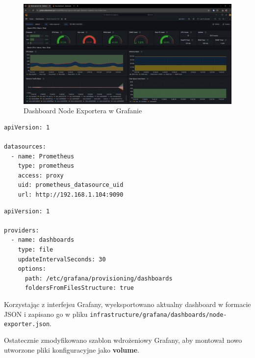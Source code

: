 \documentclass{article}
\begin{document}
\begin{figure}[H]
    \centering
    \includegraphics[width=1\linewidth]{grafanaNodeExporterDashboard.png}
    \caption{Dashboard Node Exportera w Grafanie}
    \label{fig:enter-label}
\end{figure}

\begin{lstlisting}[caption=Plik \texttt{infrastructure/grafana/datasources/datasources.yml}]
apiVersion: 1

datasources:
  - name: Prometheus
    type: prometheus
    access: proxy
    uid: prometheus_datasource_uid
    url: http://192.168.1.104:9090
\end{lstlisting}

\begin{lstlisting}[caption=Plik \texttt{infrastructure/grafana/dashboards/dashboards.yml}]
apiVersion: 1

providers:
  - name: dashboards
    type: file
    updateIntervalSeconds: 30
    options:
      path: /etc/grafana/provisioning/dashboards
      foldersFromFilesStructure: true
\end{lstlisting}

Korzystając z interfejsu Grafany, wyeksportowano aktualny dashboard w formacie JSON i zapisano go w pliku \lstinline|infrastructure/grafana/dashboards/node-exporter.json|.

Ostatecznie zmodyfikowano szablon wdrożeniowy Grafany, aby montował nowo utworzone pliki konfiguracyjne jako \textbf{volume}.
\end{document}
